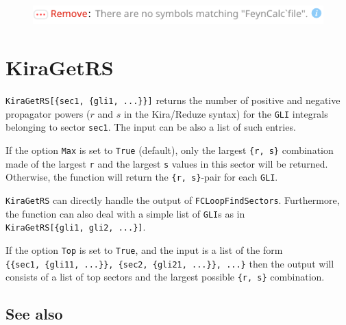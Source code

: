 \documentclass[../FeynHelpersManual.tex]{subfiles}
\begin{document}
\FloatBarrier
\begin{figure}[!ht]
\centering
\includegraphics[width=0.6\linewidth]{img/0eugcbgadj6yz.pdf}
\end{figure}
\FloatBarrier

\begin{Shaded}
\begin{Highlighting}[]
 
\end{Highlighting}
\end{Shaded}

\hypertarget{kiragetrs}{
\section{KiraGetRS}\label{kiragetrs}}

\texttt{KiraGetRS[\allowbreak{}\{\allowbreak{}sec1,\ \allowbreak{}\{\allowbreak{}gli1,\ \allowbreak{}...\}\}]}
returns the number of positive and negative propagator powers (\(r\) and
\(s\) in the Kira/Reduze syntax) for the \texttt{GLI} integrals
belonging to sector \texttt{sec1}. The input can be also a list of such
entries.

If the option \texttt{Max} is set to \texttt{True} (default), only the
largest \texttt{\{\allowbreak{}r,\ \allowbreak{}s\}} combination made of
the largest \texttt{r} and the largest \texttt{s} values in this sector
will be returned. Otherwise, the function will return the
\texttt{\{\allowbreak{}r,\ \allowbreak{}s\}}-pair for each \texttt{GLI}.

\texttt{KiraGetRS} can directly handle the output of
\texttt{FCLoopFindSectors}. Furthermore, the function can also deal with
a simple list of \texttt{GLI}s as in
\texttt{KiraGetRS[\allowbreak{}\{\allowbreak{}gli1,\ \allowbreak{}gli2,\ \allowbreak{}...\}]}.

If the option \texttt{Top} is set to \texttt{True}, and the input is a
list of the form
\texttt{\{\allowbreak{}\{\allowbreak{}sec1,\ \allowbreak{}\{\allowbreak{}gli11,\ \allowbreak{}...\}\},\ \allowbreak{}\{\allowbreak{}sec2,\ \allowbreak{}\{\allowbreak{}gli21,\ \allowbreak{}...\}\},\ \allowbreak{}...\}}
then the output will consists of a list of top sectors and the largest
possible \texttt{\{\allowbreak{}r,\ \allowbreak{}s\}} combination.

\subsection{See also}
\end{document}
